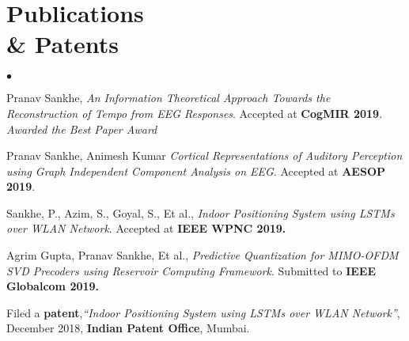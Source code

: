 \documentclass[margin,line, 9pt]{res}
\newenvironment{list2}{
  \begin{list}{$\bullet$}{%
      \setlength{\itemsep}{0.03in}
      \setlength{\parsep}{0in} \setlength{\parskip}{0in}
      \setlength{\topsep}{0in} \setlength{\partopsep}{0in} 
      \setlength{\leftmargin}{0.2in}}}{\end{list}}
\begin{document}
\section{\sc Publications  \\ \& Patents}
\begin{list2}
\item Pranav Sankhe, {\em An Information Theoretical Approach Towards the Reconstruction of Tempo from EEG Responses}. Accepted at \textbf{CogMIR 2019}. \emph{Awarded the Best Paper Award}
%
\item Pranav Sankhe, Animesh Kumar {\em Cortical Representations of Auditory Perception using Graph Independent Component Analysis on EEG}. Accepted at \textbf{AESOP 2019}.
%
\item Sankhe, P., Azim, S., Goyal, S., Et al., {\em Indoor Positioning System using LSTMs over WLAN Network}. Accepted at \textbf{IEEE WPNC 2019.}
%
\item Agrim Gupta, Pranav Sankhe, Et al., {\em Predictive Quantization for MIMO-OFDM SVD Precoders using Reservoir Computing Framework}. Submitted to \textbf{IEEE Globalcom 2019.}
% 
\item {Filed a \textbf{patent},\em “Indoor Positioning System using LSTMs over WLAN Network”}, December 2018, \textbf{Indian Patent Office}, Mumbai.
%
%
\end{list2}
%
%
%
\vspace*{-.13in}
\end{document}
